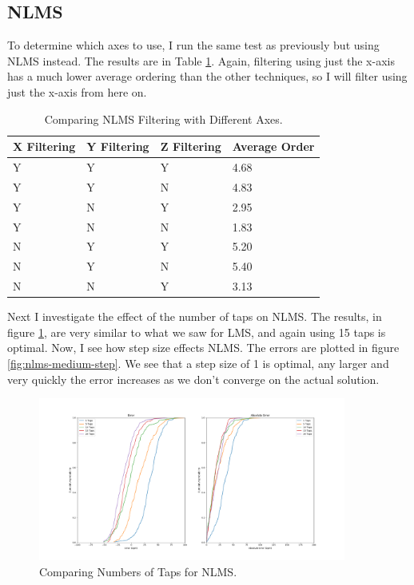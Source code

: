 \documentclass[12pt,a4paper,twoside,openany]{report}
\begin{document}
\subsection{NLMS}

To determine which axes to use, I run the same test as previously but using
NLMS instead. The results are in Table \ref{table:nlms-errors}. Again,
filtering using just the x-axis has a much lower average ordering than the
other techniques, so I will filter using just the x-axis from here on.

\begin{table}[]
\centering
\caption{Comparing NLMS Filtering with Different Axes.}
\label{table:nlms-errors}
\begin{tabular}{|l|l|l|l|}
\hline
X Filtering & Y Filtering & Z Filtering & Average Order \\ \hline
Y           & Y           & Y           & 4.68          \\
Y           & Y           & N           & 4.83          \\
Y           & N           & Y           & 2.95          \\
Y           & N           & N           & 1.83          \\
N           & Y           & Y           & 5.20          \\
N           & Y           & N           & 5.40          \\
N           & N           & Y           & 3.13          \\
\hline
\end{tabular}
\end{table}

Next I investigate the effect of the number of taps on NLMS. The results, in
figure \ref{fig:nlms-medium-taps}, are very similar to what we saw for LMS, and
again using 15 taps is optimal.
Now, I see how step size effects NLMS. The errors are plotted in
figure \ref{fig:nlms-medium-step}. We see that a step size of 1 is optimal,
any larger and very quickly the error increases as we don't converge on the
actual solution.

\begin{figure}[H]
	\centerline{\includegraphics[width=0.9\textwidth]{figs/nlms-taps-error-medium-noise.png}}
	\caption{Comparing Numbers of Taps for NLMS.}
	\label{fig:nlms-medium-taps}
\end{figure}
\end{document}
